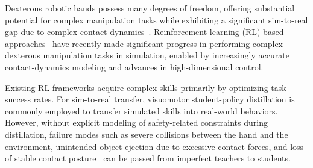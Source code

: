
Dexterous robotic hands possess many degrees of freedom, offering substantial
potential for complex manipulation tasks while exhibiting a significant
sim-to-real gap due to complex contact dynamics~\cite{brahmbhatt2019contactgrasp,chen2022system,andrychowicz2020learning,luo2025precise}.
Reinforcement learning (RL)-based approaches~\cite{rajeswaran2017learning,andrychowicz2020learning,akkaya2019solving,petrenko2023dexpbt}
have recently made significant progress in performing complex dexterous
manipulation tasks in simulation, enabled by increasingly accurate contact-dynamics
modeling and advances in high-dimensional control.

Existing RL frameworks acquire complex skills primarily by optimizing task
success rates. For sim-to-real transfer, visuomotor student-policy distillation
is commonly employed to transfer simulated skills into real-world behaviors.
However, without explicit modeling of safety-related constraints during
distillation, failure modes such as severe collisions between the hand and the
environment, unintended object ejection due to excessive contact forces, and
loss of stable contact posture~\cite{liu2023safe,yu2022dexterous} can be passed
from imperfect teachers to students.




